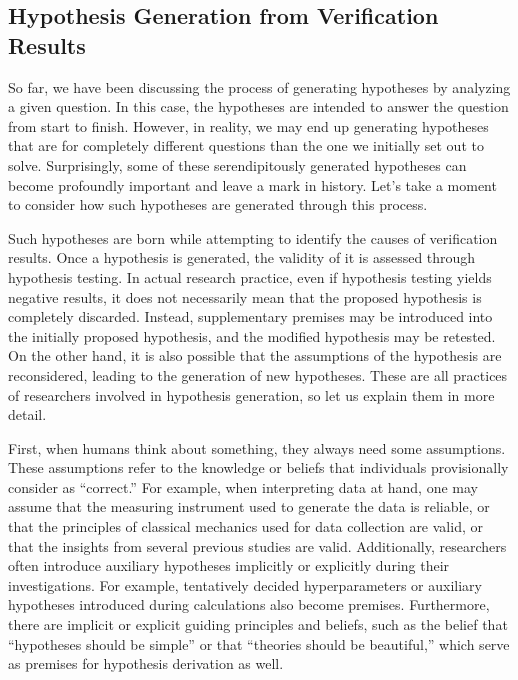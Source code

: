 
\subsection{Hypothesis Generation from Verification Results}
So far, we have been discussing the process of generating hypotheses by analyzing a given question. In this case, the hypotheses are intended to answer the question from start to finish. However, in reality, we may end up generating hypotheses that are for completely different questions than the one we initially set out to solve. Surprisingly, some of these serendipitously generated hypotheses can become profoundly important and leave a mark in history. Let's take a moment to consider how such hypotheses are generated through this process.

Such hypotheses are born while attempting to identify the causes of verification results. Once a hypothesis is generated, the validity of it is assessed through hypothesis testing. In actual research practice, even if hypothesis testing yields negative results, it does not necessarily mean that the proposed hypothesis is completely discarded. Instead, supplementary premises may be introduced into the initially proposed hypothesis, and the modified hypothesis may be retested. On the other hand, it is also possible that the assumptions of the hypothesis are reconsidered, leading to the generation of new hypotheses. These are all practices of researchers involved in hypothesis generation, so let us explain them in more detail.

First, when humans think about something, they always need some assumptions. These assumptions refer to the knowledge or beliefs that individuals provisionally consider as ``correct.'' For example, when interpreting data at hand, one may assume that the measuring instrument used to generate the data is reliable, or that the principles of classical mechanics used for data collection are valid, or that the insights from several previous studies are valid. Additionally, researchers often introduce auxiliary hypotheses implicitly or explicitly during their investigations. For example, tentatively decided hyperparameters or auxiliary hypotheses introduced during calculations also become premises. Furthermore, there are implicit or explicit guiding principles and beliefs, such as the belief that ``hypotheses should be simple'' or that ``theories should be beautiful,'' which serve as premises for hypothesis derivation as well.

